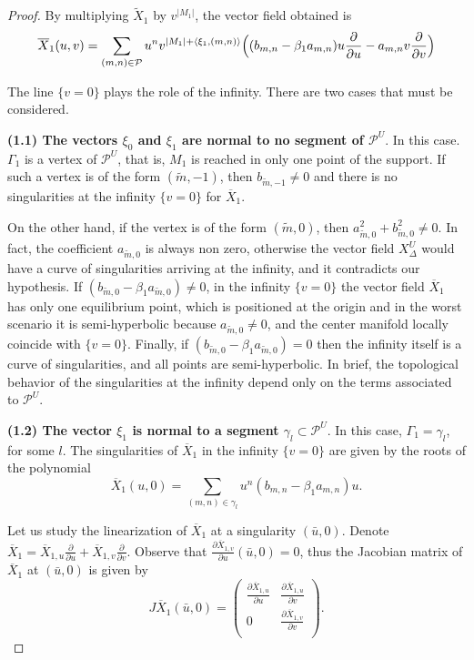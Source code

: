 \documentclass[12pt]{amsart}
\begin{document}
\begin{proof}
By multiplying $\widetilde{X}_{1}$ by $v^{|M_{1}|}$, the vector field obtained is
\begin{equation}\label{eq-main-theorem-compact-chart-1}
\overline{X}_{1}(u,v) = \sum_{(m,n)\in\mathcal{P}} u^{n}v^{|M_{1}| + \langle\xi_{1},(m,n)\rangle}\Big{(}(b_{m,n} - \beta_{1}a_{m,n})u\frac{\partial}{\partial u} - a_{m,n}v\frac{\partial}{\partial v}\Big{)}
\end{equation}

The line $\{v = 0\}$ plays the role of the infinity. There are two cases that must be considered.

\textbf{(1.1) The vectors $\xi_{0}$ and $\xi_{1}$ are normal to no segment of $\mathcal{P}^{U}$}. In this case. $\Gamma_{1}$ is a vertex of $\mathcal{P}^{U}$, that is, $M_{1}$ is reached in only one point of the support. If such a vertex is of the form $(\tilde{m},-1)$, then $b_{\tilde{m},-1} \neq 0$ and there is no singularities at the infinity $\{v = 0\}$ for $\overline{X}_{1}$.


On the other hand, if the vertex is of the form $(\tilde{m},0)$, then $a_{\tilde{m},0}^{2} + b_{\tilde{m},0}^{2} \neq 0$. In fact, the coefficient $a_{\tilde{m},0}$ is always non zero, otherwise the vector field $X_{\Delta}^{U}$ would have a curve of singularities arriving at the infinity, and it contradicts our hypothesis. If $(b_{\tilde{m},0} - \beta_{1}a_{\tilde{m},0}) \neq 0$, in the infinity $\{v = 0\}$ the vector field $\overline{X}_{1}$ has only one equilibrium point, which is positioned at the origin and in the worst scenario it is semi-hyperbolic because $a_{\tilde{m},0}\neq 0$, and the center manifold locally coincide with $\{v = 0\}$. Finally, if $(b_{\tilde{m},0} - \beta_{1}a_{\tilde{m},0}) = 0$ then the infinity itself is a curve of singularities, and all points are semi-hyperbolic. In brief, the topological behavior of the singularities at the infinity depend only on the terms associated to $\mathcal{P}^{U}$.

\textbf{(1.2) The vector $\xi_{1}$ is normal to a segment $\gamma_{l}\subset\mathcal{P}^{U}$}. In this case, $\Gamma_{1} = \gamma_{l}$, for some $l$. The singularities of $\overline{X}_{1}$ in the infinity $\{v = 0\}$ are given by the roots of the polynomial
\begin{equation*}
\overline{X}_{1}(u,0) = \sum_{(m,n)\in\gamma_{l}} u^{n}(b_{m,n} - \beta_{1}a_{m,n})u.
\end{equation*}

Let us study the linearization of $\overline{X}_{1}$ at a singularity $(\bar{u},0)$. Denote $\overline{X}_{1} = \overline{X}_{1,u}\frac{\partial}{\partial u} + \overline{X}_{1,v}\frac{\partial}{\partial v}$. Observe that $\frac{\partial \overline{X}_{1,v}}{\partial u}(\bar{u},0) = 0$, thus the Jacobian matrix of $\overline{X}_{1}$ at $(\bar{u},0)$ is given by
$$
J\overline{X}_{1}(\bar{u},0) = \left(
  \begin{array}{cc}
    \frac{\partial \overline{X}_{1,u}}{\partial u} & \frac{\partial \overline{X}_{1,u}}{\partial v} \\
    0 & \frac{\partial \overline{X}_{1,v}}{\partial v} \\
  \end{array}
\right).
$$


\end{proof}
\end{document}
